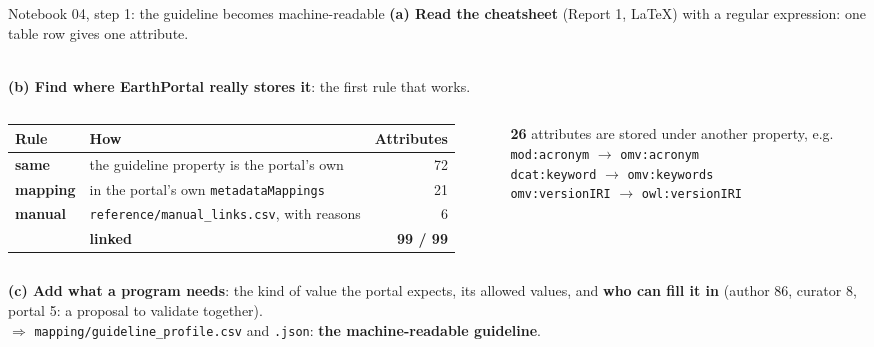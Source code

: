 \documentclass[aspectratio=169,10pt]{beamer}
\begin{document}
\begin{frame}{Notebook 04, step 1: the guideline becomes machine-readable}
  \small
  \textbf{(a) Read the cheatsheet} (Report 1, \LaTeX) with a regular expression: one table row gives one attribute.\\[4pt]
  \\[6pt]
  \textbf{(b) Find where EarthPortal really stores it}: the first rule that works.\\[3pt]
  \begin{columns}[T]
    \begin{column}{0.55\textwidth}
      \scriptsize
      \begin{tabular}{@{}l l r@{}}
        \toprule
        Rule & How & Attributes\\
        \midrule
        \textbf{same} & the guideline property is the portal's own & 72\\
        \textbf{mapping} & in the portal's own \texttt{metadataMappings} & 21\\
        \textbf{manual} & \texttt{reference/manual\_links.csv}, with reasons & 6\\
        \midrule
        & \textbf{linked} & \textbf{99 / 99}\\
        \bottomrule
      \end{tabular}
    \end{column}
    \begin{column}{0.42\textwidth}
      \scriptsize
      \textbf{26} attributes are stored under another property, e.g.\\[2pt]
      \texttt{mod:acronym} $\rightarrow$ \texttt{omv:acronym}\\
      \texttt{dcat:keyword} $\rightarrow$ \texttt{omv:keywords}\\
      \texttt{omv:versionIRI} $\rightarrow$ \texttt{owl:versionIRI}
    \end{column}
  \end{columns}
  \vspace{6pt}
  \textbf{(c) Add what a program needs}: the kind of value the portal expects, its allowed values, and
  \textbf{who can fill it in} (author 86, curator 8, portal 5: a proposal to validate together).\\[3pt]
  $\Rightarrow$ \texttt{mapping/guideline\_profile.csv} and \texttt{.json}: \textbf{the machine-readable guideline}.
\end{frame}
\end{document}
